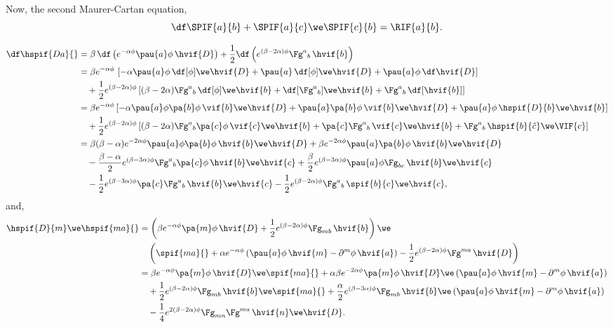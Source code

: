 Now, the second Maurer-Cartan equation,
\begin{equation}
  \df\SPIF{a}{b} + \SPIF{a}{c} \we \SPIF{c}{b} = \RIF{a}{b}.
\end{equation}

\begin{align}
  \df\hspif{D a}{} 
  &= \beta \, \df \left( e^{-\alpha \phi} \pau{a} \phi \,\hvif{D} \right) + \frac{1}{2} \df \left( e^{(\beta - 2\alpha) \phi} \Fg^a{}_{b} \, \hvif{b} \right) \nonumber\\
  &= \beta e^{-\alpha\phi} \, \left[ -\alpha \pau{a} \phi \, \df[\phi] \we \hvif{D} + \pau{a} \, \df[\phi] \we \hvif{D} + \pau{a} \phi \, \df \hvif{D} \right] \notag \\
  &\quad + \frac{1}{2} e^{(\beta - 2\alpha) \phi} \left[ (\beta-2\alpha) \Fg^a{}_{b} \, \df[\phi] \we \hvif{b} + \df[\Fg^a{}_{b}] \we \hvif{b} + \Fg^a{}_{b} \, \df[\hvif{b}] \right] \nonumber \\
  &= \beta e^{-\alpha\phi} \left[ -\alpha \pau{a} \phi \pa{b} \phi \, \vif{b} \we \hvif{D} + \pau{a} \pa{b} \phi \, \vif{b} \we \hvif{D} + \pau{a} \phi \, \hspif{D}{b} \we \hvif{b} \right] \notag \\
  &\quad + \frac{1}{2} e^{(\beta - 2\alpha) \phi} \left[ (\beta - 2\alpha) \Fg^a{}_b \pa{c} \phi \, \vif{c} \we \hvif{b} + \pa{c} \Fg^a{}_b \, \vif{c} \we \hvif{b} + \Fg^a{}_b \, \hspif{b}{\hat{c}} \we \VIF{c} \right] \nonumber \\
  &= \beta (\beta - \alpha) e^{-2\alpha \phi} \pau{a} \phi \pa{b} \phi \, \hvif{b} \we \hvif{D} + \beta e^{-2\alpha \phi} \pau{a} \pa{b} \phi \, \hvif{b} \we \hvif{D}  \notag \\
  &\quad - \frac{\beta-\alpha}{2} e^{(\beta - 3\alpha) \phi} \Fg^a{}_b \pa{c} \phi\, \hvif{b} \we \hvif{c} + \frac{\beta}{2} e^{(\beta - 3\alpha) \phi} \pau{a} \phi \Fg_{bc} \, \hvif{b} \we \hvif{c} \nonumber \\
  &\quad -\frac{1}{2} e^{(\beta - 3\alpha) \phi} \pa{c} \Fg^a{}_b \, \hvif{b} \we \hvif{c} - \frac{1}{2} e^{(\beta - 2\alpha) \phi} \Fg^a{}_b \, \spif{b}{c} \we \hvif{c},
\end{align}
and,
\begin{align}
  \hspif{D}{m} \we \hspif{m a}{}
  &= \left(\beta e^{-\alpha\phi}\pa{m}\phi\,\hvif{D} + \frac{1}{2}e^{(\beta-2\alpha)\phi}\Fg_{m b}\,\hvif{b}  \right) \we \notag\\
  &\quad \left(\spif{m a}{} + \alpha e^{-\alpha\phi}\left(\pau{a}\phi\,\hvif{m} - \partial^{m}\phi\,\hvif{a}\right) - \frac{1}{2}e^{(\beta-2\alpha)\phi}\Fg^{m a}\,\hvif{D}  \right)\nonumber\\
  &= \beta e^{-\alpha\phi}\pa{m}\phi\,\hvif{D} \we \spif{m a}{} + \alpha\beta e^{-2\alpha\phi}\pa{m}\phi\,\hvif{D} \we \left(\pau{a}\phi\,\hvif{m} - \partial^{m}\phi\,\hvif{a}\right)\nonumber\\
  &\quad + \frac{1}{2}e^{(\beta-2\alpha)\phi}\Fg_{m b}\,\hvif{b} \we \spif{m a}{} + \frac{\alpha}{2}e^{(\beta-3\alpha)\phi}\Fg_{m b}\,\hvif{b} \we \left(\pau{a}\phi\,\hvif{m} - \partial^{m}\phi\,\hvif{a}\right)\nonumber\\
  &\quad -\frac{1}{4}e^{2(\beta-2\alpha)\phi}\Fg_{m n}\Fg^{m a}\,\hvif{n} \we \hvif{D}.
\end{align}
